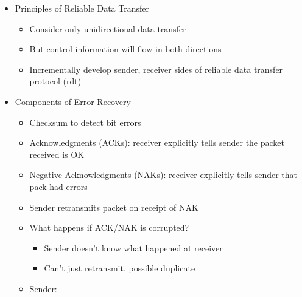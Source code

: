 \begin{itemize}
\begin{itemize}
\begin{itemize}
\begin{itemize}
            \end{itemize}

        \end{itemize}

    \end{itemize}

  \item Principles of Reliable Data Transfer

    \begin{itemize}

      \item Consider only unidirectional data transfer

      \item But control information will flow in both directions

      \item Incrementally develop sender, receiver sides of reliable data transfer protocol (rdt)

    \end{itemize}

  \item Components of Error Recovery

    \begin{itemize}

      \item Checksum to detect bit errors

      \item Acknowledgments (ACKs): receiver explicitly tells sender the packet received is OK

      \item Negative Acknowledgments (NAKs): receiver explicitly tells sender that pack had errors

      \item Sender retransmits packet on receipt of NAK

      \item What happens if ACK/NAK is corrupted?

        \begin{itemize}

          \item Sender doesn't know what happened at receiver

          \item Can't just retransmit, possible duplicate

        \end{itemize}

      \item Sender:


\end{itemize}
\end{itemize}
